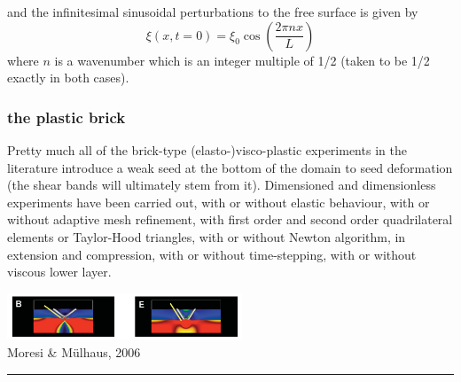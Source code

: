 and the infinitesimal sinusoidal perturbations to the free surface is given by
\[
\xi(x,t=0)=\xi_0 \cos \left( \frac{2 \pi n x}{L}  \right)
\]
where $n$ is a wavenumber which is an integer multiple of 1/2 (taken to be 1/2 exactly in both cases).


\subsubsection{the plastic brick}

\Literature \cite{hans03,moml07,lemm08,kaus10,egat10,qurj09,mishin11,maie12,spmw16,gltf18,frbt19,aspectmanual}

Pretty much all of the brick-type (elasto-)visco-plastic experiments in the literature
introduce a weak seed at the bottom of the domain to seed deformation (the shear bands
will ultimately stem from it). 
Dimensioned and dimensionless experiments have been carried out, with or without 
elastic behaviour, with or without adaptive mesh refinement, with first order and 
second order quadrilateral elements or Taylor-Hood triangles, with or without 
Newton algorithm, in extension and compression, with or without time-stepping,
with or without viscous lower layer. 


\begin{center}
\includegraphics[width=7cm]{images/benchmark_brick/momu06}\\
{\captionfont Moresi \& M{\"u}lhaus, 2006 \cite{momu06}}
\end{center}

\begin{center}\noindent\rule{8cm}{0.4pt}\end{center}

